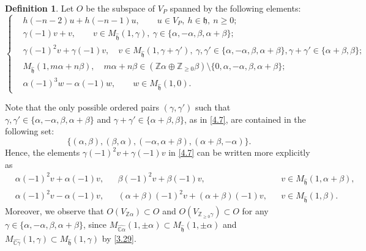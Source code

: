 \documentclass[12pt,a4paper,reqno]{amsart}
\numberwithin{equation}{section}
\numberwithin{equation}{section}
\theoremstyle{definition}
\newtheorem{df}[thm]{Definition}
\begin{document}
	\begin{df}\label{df4.3}
		Let $O$ be the subspace of $V_P$ spanned by the following elements:
		\begin{equation}\label{4.7}
			\begin{cases}
				&h(-n-2)u+h(-n-1)u,\qquad u\in V_P,\ h\in \mathfrak{h},\ n\geq 0;\\[4pt]
				&\gamma(-1)v+v,\qquad v\in M_{\hat{\mathfrak{h}}}(1,\gamma),\ \gamma\in \{\alpha,-\alpha,\beta,\alpha+\beta\};\\[4pt]
				&\gamma(-1)^2v+\gamma(-1)v,\quad v\in M_{\hat{\mathfrak{h}}}(1,\gamma+\gamma'),\ \gamma,\gamma'\in \{\alpha,-\alpha,\beta,\alpha+\beta\},\gamma+\gamma'\in \{\alpha+\beta,\beta\};\\[4pt]
				&M_{\hat{\mathfrak{h}}}(1,m\alpha+n\beta),\quad m\alpha+n\beta\in (\mathbb{Z}\alpha\oplus\mathbb{Z}_{\geq 0}\beta)\setminus\{0,\alpha,-\alpha,\beta,\alpha+\beta\};\\[4pt]
				&\alpha(-1)^3w-\alpha(-1)w,\qquad w\in M_{\hat{\mathfrak{h}}}(1,0).
			\end{cases}
		\end{equation}
	\end{df}
	
	Note that the only possible ordered pairs $(\gamma,\gamma')$ such that $\gamma,\gamma'\in \{\alpha,-\alpha,\beta,\alpha+\beta\}$ and $\gamma+\gamma'\in \{\alpha+\beta,\beta\}$, as in \eqref{4.7}, are contained in the following set:
	\begin{equation}\label{4.8}
		\{(\alpha,\beta),(\beta,\alpha),(-\alpha,\alpha+\beta),(\alpha+\beta,-\alpha)\}.
	\end{equation}
	Hence, the elements $\gamma(-1)^2v+\gamma(-1)v$ in \eqref{4.7} can be written more explicitly as
	\begin{align}
		&\alpha(-1)^2v+\alpha(-1)v, &&\beta(-1)^2v+\beta(-1)v, &&v\in M_{\hat{\mathfrak{h}}}(1,\alpha+\beta),\label{extra1}\\
		&\alpha(-1)^2v-\alpha(-1)v, &&(\alpha+\beta)(-1)^2v+(\alpha+\beta)(-1)v, &&v\in M_{\hat{\mathfrak{h}}}(1,\beta).\label{extra2}
	\end{align}
	Moreover, we observe that $O(V_{\mathbb{Z}\alpha})\subset O$ and $O(V_{\mathbb{Z}_{\geq 0}\gamma})\subset O$ for any $\gamma\in\{\alpha,-\alpha,\beta,\alpha+\beta\}$, since $M_{\widehat{\mathbb{C}\alpha}}(1,\pm\alpha)\subset M_{\hat{\mathfrak{h}}}(1,\pm\alpha)$ and $M_{\widehat{\mathbb{C}\gamma}}(1,\gamma)\subset M_{\hat{\mathfrak{h}}}(1,\gamma)$ by \eqref{3.29}.
	
\end{document}
